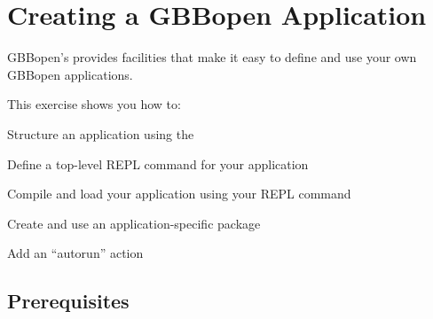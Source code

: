 \documentclass[10pt,twoside,english,pdftex]{article}
\begin{document}

\T\markright{}%
\T\pagestyle{plain}
\T\cleardoublepage
\W{}
\T\pagestyle{fancy}
\T\thispagestyle{fancybottom}
\T\renewcommand{\headrulewidth}{0pt}
\section{Creating a GBBopen Application}
\label{sec:application}%

GBBopen's  provides facilities
that make it easy to define and use your own GBBopen applications.

\fndocrule

This exercise shows you how to:
\begin{tightitemize}
\item Structure an application using the 
\item Define a top-level REPL command for your application
\item Compile and load your application using your REPL command
\item Create and use an application-specific package
\item Add an ``autorun'' action
\end{tightitemize}

\fndocrule

\subsection*{Prerequisites}
\end{document}
